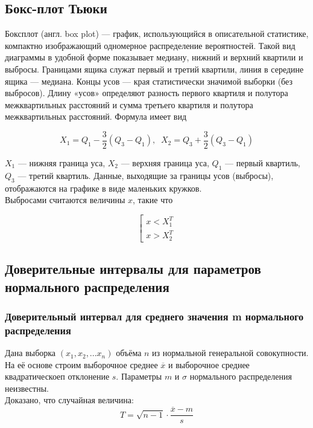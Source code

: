 \subsection{Бокс-плот Тьюки}
Боксплот (англ. box plot) — график, использующийся в описательной статистике, компактно изображающий одномерное распределение вероятностей.
Такой вид диаграммы в удобной форме показывает медиану, нижний и верхний квартили и выбросы. Границами ящика служат первый и третий квартили, линия в середине ящика — медиана. Концы усов — края статистически
значимой выборки (без выбросов). Длину «усов» определяют разность первого квартиля и полутора межквартильных расстояний и сумма третьего
квартиля и полутора межквартильных расстояний. Формула имеет вид

\begin{equation}
    X_{1} = Q_{1} - \dfrac{3}{2}(Q_{3} -Q_{1}),\;\; X_{2} = Q_{3} + \dfrac{3}{2}(Q_{3} -Q_{1})
    \label{eq13}
\end{equation}

 $X_{1}$ — нижняя граница уса, $X_{2}$ — верхняя граница уса, $Q_{1}$ — первый
квартиль, $Q_{3}$ — третий квартиль. Данные, выходящие за границы усов (выбросы), отображаются на графике в виде маленьких кружков.\\
Выбросами считаются величины $x$, такие что


\begin{equation}
    \left[
  \begin{array}{ccc}
        x < X_{1}^{T}\\
        x > X_{2}^{T}
  \end{array}
\right.
\label{eq14}
\end{equation}

\subsection{ Доверительные интервалы для параметров нормального распределения}

\subsubsection{Доверительный интервал для среднего значения m нормального распределения}

Дана выборка $(x_1, x_2, ... x_n)$ объёма $n$ из нормальной генеральной совокупности. На её основе строим выборочное среднее $\overline{x}$ и выборочное среднее квадратическоеп отклонение $s$. Параметры $m$ и $\sigma$ нормального распределения неизвестны.\\
Доказано, что случайная величина:
\begin{equation}
    T = \sqrt{n - 1}\cdot \dfrac{\overline{x} - m}{s}
    \label{eq15}
\end{equation}

